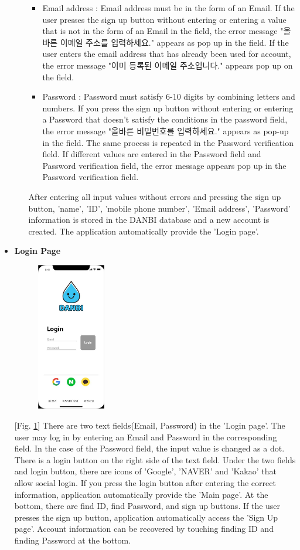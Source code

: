 \documentclass[conference]{IEEEtran}
\begin{document}
\begin{itemize}
\begin{enumerate}
\begin{itemize}
\item Email address : Email address must be in the form of an Email. If the user presses the sign up button without entering or entering a value that is not in the form of an Email in the field, the error message "올바른 이메일 주소를 입력하세요." appears as pop up in the field. If the user enters the email address that has already been used for account, the error message "이미 등록된 이메일 주소입니다." appears pop up on the field.
\item Password : Password must satisfy 6-10 digits by combining letters and numbers. If you press the sign up button without entering or entering a Password that doesn't satisfy the conditions in the password field, the error message "올바른 비밀번호를 입력하세요." appears as pop-up in the field. The same process is repeated in the Password verification field. If different values are entered in the Password field and Password verification field, the error message appears pop up in the Password verification field.
\end{itemize}
After entering all input values without errors and pressing the sign up button, 'name', 'ID', 'mobile phone number', 'Email address', 'Password' information is stored in the DANBI database and a new account is created. The application automatically provide the 'Login page'.
\end{enumerate}

\item \textbf{Login Page}

\par \begin{figure}[h!]
\includegraphics[width=3cm]{xd/login page.JPG}
\centering
\caption{}
\label{fig:login}
\end{figure}

[Fig. \ref{fig:login}] There are two text fields(Email, Password) in the 'Login page'. The user may log in by entering an Email and Password in the corresponding field. In the case of the Password field, the input value is changed as a dot. There is a login button on the right side of the text field. Under the two fields and login button, there are icons of 'Google', 'NAVER' and 'Kakao' that allow social login. If you press the login button after entering the correct information, application automatically provide the 'Main page'. At the bottom, there are find ID, find Password, and sign up buttons. If the user presses the sign up button, application automatically access the 'Sign Up page'. Account information can be recovered by touching finding ID and finding Password at the bottom.


\end{itemize}
\end{document}
